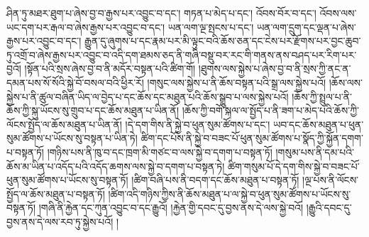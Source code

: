 ཤིན་ཏུ་མཐར་ཐུག་པ་ཞེས་བྱ་བ་རྒྱས་པར་འབྱུང་བ་དང་། གཏན་པ་མེད་པ་དང་། འོབས་བོར་བ་དང་། འོབས་ལས་ཡང་དག་པར་རྒལ་བ་ཞེས་རྒྱས་པར་འབྱུང་བ་དང་། ཡན་ལག་ལྔ་སྤངས་པ་དང་། ཡན་ལག་དྲུག་དང་ལྡན་པ་ཞེས་རྒྱས་པར་འབྱུང་བ་དང་། རྒྱུན་དུ་ཞུགས་པ་དང་རྣམ་པར་མི་ལྟུང་བའི་ཆོས་ཅན་དང་ངེས་པར་རྫོགས་པར་བྱང་ཆུབ་ཏུ་འགྲོ་བ་ཞེས་རྒྱས་པར་འབྱུང་བ་འདི་དག་ཐམས་ཅད་ནི་གཞི་བསྡུ་བར་རང་གི་གནས་ནས་བཤད་པར་རིག་པར་བྱའོ། །སྟོན་པའི་སྲས་ཞེས་བྱ་བ་ནི་མདོར་བསྟན་པའི་ཚིག་གོ། །ཐུགས་ལས་སྐྱེས་པ་ཞེས་བྱ་བ་ནི་སྲས་ཀྱི་ནང་ན་དམན་པས་སོ་སོའི་སྐྱེ་བོ་བསལ་བའི་ཕྱིར་རོ། །གསུང་ལས་སྐྱེས་པ་ནི་ཆོས་བསྟན་པའི་སྒྲ་ལས་སྐྱེས་པའོ། །ཆོས་ལས་སྐྱེས་པ་ནི་ཚུལ་བཞིན་ཡིད་ལ་བྱེད་པ་དང་ཆོས་དང་མཐུན་པའི་ཆོས་སྒྲུབ་པ་ལས་སྐྱེས་པའོ། །ཆོས་ཀྱི་སྤྲུལ་པ་ནི་ཆོས་ཀྱི་སྐུ་ཡོངས་སུ་གྲུབ་པ་དང་ཆོས་མཐུན་པ་ཡིན་ནོ། །ཆོས་ཀྱི་བགོ་སྐལ་ལ་སྤྱོད་པ་ནི་ཟག་པ་མེད་པའི་ཆོས་ཀྱི་ལོངས་སྤྱོད་ལ་ཆོས་མཐུན་པ་ཡིན་ནོ། །དེ་དག་གིས་ནི་སྐྱེ་བ་ཕུན་སུམ་ཚོགས་པ་དང་། ཡབ་དང་ཆོས་མཐུན་པ་ཕུན་སུམ་ཚོགས་པ་ཡོངས་སུ་བསྟན་པ་ཡིན་ཏེ། ཚིག་དང་པོས་ནི་སྐྱེ་བ་བཟང་པོ་ཕུན་སུམ་ཚོགས་པ་སྣོད་ཀྱི་སྐྱོན་དགག་པ་བསྟན་ཏོ། །གཉིས་པས་ནི་ཁུ་བ་དང་ཁྲག་མི་གཙང་བ་ལས་སྐྱེ་བ་དགག་པ་བསྟན་ཏོ། །གསུམ་པས་ནི་དམ་པའི་ཆོས་མ་ཡིན་པ་འདོད་པའི་འདོད་ཆགས་ལས་སྐྱེ་བ་དགག་པ་བསྟན་ཏེ། ཚིག་གསུམ་པོ་དེ་དག་གིས་སྐྱེ་བ་བཟང་པོ་ཕུན་སུམ་ཚོགས་པ་ཡོངས་སུ་བསྟན་ཏོ། །ཚིག་བཞི་པས་ནི་བདག་དང་ཆོས་མཐུན་པ་བསྟན་ཏོ། །ལྔ་པས་ནི་ལོངས་སྤྱོད་ལ་ཆོས་མཐུན་པ་བསྟན་ཏོ། །ཚིག་འདི་གཉིས་ཀྱིས་ནི་ཆོས་མཐུན་པ་ལ་སྐྱེ་བ་ཕུན་སུམ་ཚོགས་པ་ཡོངས་སུ་བསྟན་ཏོ། །གཞི་ནི་རྐྱེན་དང་ཀུན་འབྱུང་བ་དང་རྒྱུའོ། །རྐྱེན་གྱི་དབང་དུ་བྱས་ནས་དེ་ལས་སྐྱེ་བའོ། །རྒྱུའི་དབང་དུ་བྱས་ནས་དེ་ལས་རབ་ཏུ་སྐྱེས་པའོ། །
